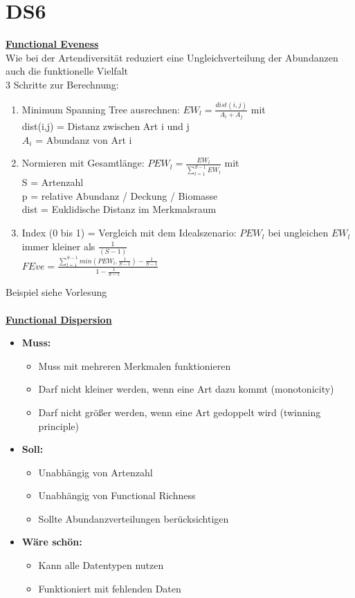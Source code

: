 \section{DS6}
\underline{\textbf{Functional Eveness}}\\
Wie bei der Artendiversität reduziert eine Ungleichverteilung der Abundanzen auch die funktionelle Vielfalt\\
3 Schritte zur Berechnung:
\begin{enumerate}
	\item Minimum Spanning Tree ausrechnen: $EW_l=\displaystyle \frac{dist(i,j)}{A_i + A_j}$ mit \\
	dist(i,j) = Distanz zwischen Art i und j\\
	$A_i$ = Abundanz von Art i
	\item Normieren mit Gesamtlänge: $PEW_l=\displaystyle \frac{EW_l}{\displaystyle \sum_{l=1}^{S-1} EW_l}$ mit\\
	S = Artenzahl\\
	p = relative Abundanz / Deckung / Biomasse\\
	dist = Euklidische Distanz im Merkmalsraum\\
	\item Index (0 bis 1) = Vergleich mit dem Idealszenario: $PEW_l$ bei ungleichen $EW_l$ immer kleiner als $\frac{1}{(S-1)}$\\
	$FEve=\displaystyle \frac{\displaystyle \sum_{l=1}^{S-1} min(PEW_l,\frac{1}{S-1}) - \frac{1}{S-1}}{1-\frac{1}{S-1}}$
\end{enumerate}

Beispiel siehe Vorlesung
\\\\
\underline{\textbf{Functional Dispersion}}
\begin{itemize}
	\item \textbf{Muss:}
	\begin{itemize}
		\item Muss mit mehreren Merkmalen funktionieren
		\item Darf nicht kleiner werden, wenn eine Art dazu kommt (monotonicity)
		\item Darf nicht größer werden, wenn eine Art gedoppelt wird (twinning principle)
	\end{itemize}
	\item \textbf{Soll:}
	\begin{itemize}
		\item Unabhängig von Artenzahl
		\item Unabhängig von Functional Richness
		\item Sollte Abundanzverteilungen berücksichtigen
	\end{itemize}
	\item \textbf{Wäre schön:}
	\begin{itemize}
		\item Kann alle Datentypen nutzen
		\item Funktioniert mit fehlenden Daten
	\end{itemize}
\end{itemize}

